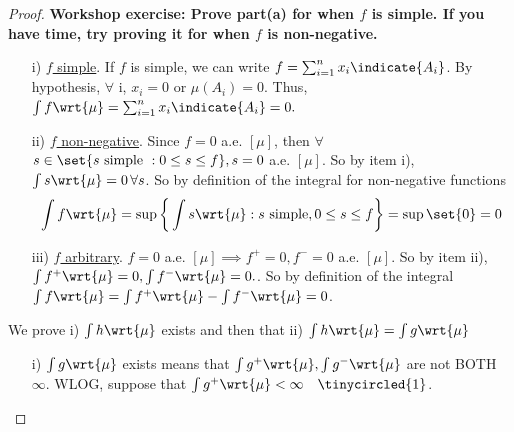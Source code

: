 \documentclass{article} %
\newif\ifActive
\newcommand{\dmu}{\wrt{\mu}}
\begin{document}
\begin{proof}
\ifActive 
	\textbf{Workshop exercise: Prove part(a) for when $f$ is simple.  If you have time, try proving it for when $f$ is non-negative.}
\else  
	
	\begin{alphabate}
	\item  
	
		\begin{enumerate}
		\item[i)] \underline{$f$ simple}.	 If $f$ is simple, we can write $f=\sum_{i=1}^n x_i \indicate{A_i}$.  By hypothesis, $\forall$ i, $x_i=0$ or $\mu(A_i)=0$.  Thus, $\int f \dmu = \sum_{i=1}^n x_i \indicate{A_i} =0.$
		\item[ii)] \underline{$f$ non-negative}. Since $f=0$ a.e. $[\mu]$, then $\forall$ $s \in \set{s \text{ simple } : 0 \leq s \leq f}, s=0$ a.e. $[\mu]$.  So by item i), $\int s \dmu =0 \, \forall s$.  So by definition of the integral for non-negative functions
		\[ \int f \dmu = \sup \bigg\{ \int s \dmu : s \text{ simple}, 0 \leq s \leq f \bigg\}  = \sup \set{0} = 0\]
		\item[iii)]\underline{$f$ arbitrary}. $f=0$ a.e. $[\mu] \implies f^+=0, f^-=0$ a.e. $[\mu]$.  So by item ii), $\int f^+ \dmu =0, \int f^- \dmu =0.$. So by definition of the integral $ \int f \dmu = \int f^+ \dmu - \int f^- \dmu =0$.
		\end{enumerate}
	\item We prove i) $\int h \dmu$ exists and then that ii) $\int h \dmu = \int g \dmu$
	
		\begin{enumerate}
		\item[i)] $\int g \dmu$ exists means that $\int g^+ \dmu, \int g^- \dmu$ are not BOTH $\infty$.  WLOG, suppose that $\int g^+ \dmu < \infty 	 \quad \tinycircled{1}$.  
		

\end{enumerate}
\end{alphabate}
\end{proof}
\end{document}
